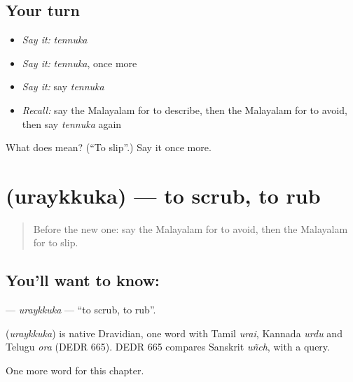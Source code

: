 \subsection*{Your turn}
\begin{itemize}
\raggedright
  \item \emph{Say it:} \emph{tennuka}
  \item \emph{Say it:} \emph{tennuka}, once more
  \item \emph{Say it:} say \emph{tennuka}
  \item \emph{Recall:} say the Malayalam for to describe, then the Malayalam for to avoid, then say \emph{tennuka} again
\end{itemize}

\begin{tcolorbox}[breakable,colback=teal!4,colframe=teal!35!black,title={Before you move on}]
What does  mean? (\textquotedblleft{}To slip\textquotedblright{}.) Say it once more.
\end{tcolorbox}
\section[\texorpdfstring{\ml{ഉരയ്ക്കുക} (uraykkuka)}{ഉരയ്ക്കുക (uraykkuka)}]{ (uraykkuka) — to scrub, to rub}

\label{lesson:ML-C310-uraykkuka}



\begin{quote}
Before the new one: say the Malayalam for to avoid, then the Malayalam for to slip.
\end{quote}

\subsection*{You'll want to know: }
\textbf{} — \emph{uraykkuka} — \textquotedblleft{}to scrub, to rub\textquotedblright{}.

\begin{cousinweb}
\textbf{} (\emph{uraykkuka}) is native Dravidian, one word with Tamil \emph{urai}, Kannada \emph{urdu} and Telugu \emph{ora} (DEDR 665). DEDR 665 compares Sanskrit \emph{uñch}, with a query.
\end{cousinweb}

\begin{grammarlens}[title={What you've built}]
One more word for this chapter.
\end{grammarlens}

